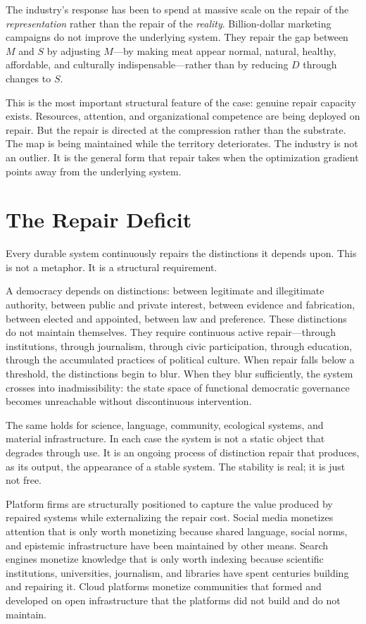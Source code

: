 \documentclass[11pt, letterpaper]{article}
\begin{document}
The industry's response has been to spend at massive scale on the repair of the \emph{representation} rather than the repair of the \emph{reality}. Billion-dollar marketing campaigns do not improve the underlying system. They repair the gap between $M$ and $S$ by adjusting $M$---by making meat appear normal, natural, healthy, affordable, and culturally indispensable---rather than by reducing $D$ through changes to $S$.

This is the most important structural feature of the case: genuine repair capacity exists. Resources, attention, and organizational competence are being deployed on repair. But the repair is directed at the compression rather than the substrate. The map is being maintained while the territory deteriorates. The industry is not an outlier. It is the general form that repair takes when the optimization gradient points away from the underlying system.

\section{The Repair Deficit}

Every durable system continuously repairs the distinctions it depends upon. This is not a metaphor. It is a structural requirement.

A democracy depends on distinctions: between legitimate and illegitimate authority, between public and private interest, between evidence and fabrication, between elected and appointed, between law and preference. These distinctions do not maintain themselves. They require continuous active repair---through institutions, through journalism, through civic participation, through education, through the accumulated practices of political culture. When repair falls below a threshold, the distinctions begin to blur. When they blur sufficiently, the system crosses into inadmissibility: the state space of functional democratic governance becomes unreachable without discontinuous intervention.

The same holds for science, language, community, ecological systems, and material infrastructure. In each case the system is not a static object that degrades through use. It is an ongoing process of distinction repair that produces, as its output, the appearance of a stable system. The stability is real; it is just not free.

Platform firms are structurally positioned to capture the value produced by repaired systems while externalizing the repair cost. Social media monetizes attention that is only worth monetizing because shared language, social norms, and epistemic infrastructure have been maintained by other means. Search engines monetize knowledge that is only worth indexing because scientific institutions, universities, journalism, and libraries have spent centuries building and repairing it. Cloud platforms monetize communities that formed and developed on open infrastructure that the platforms did not build and do not maintain.
\end{document}

